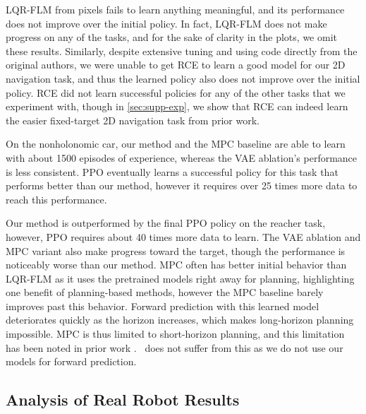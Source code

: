 LQR-FLM from pixels fails to learn anything meaningful, and its performance does not improve over the initial policy. In fact, LQR-FLM does not make progress on any of the tasks, and for the sake of clarity in the plots, we omit these results. Similarly, despite extensive tuning and using code directly from the original authors, we were unable to get RCE to learn a good model for our 2D navigation task, and thus the learned policy also does not improve over the initial policy. RCE did not learn successful policies for any of the other tasks that we experiment with, though in \autoref{sec:supp-exp}, we show that RCE can indeed learn the easier fixed-target 2D navigation task from prior work.

On the nonholonomic car, our method and the MPC baseline are able to learn with about 1500 episodes of experience, whereas the VAE ablation's performance is less consistent. PPO eventually learns a successful policy for this task that performs better than our method, however it requires over 25 times more data to reach this performance.

Our method is outperformed by the final PPO policy on the reacher task, however, PPO requires about 40 times more data to learn. The VAE ablation and MPC variant also make progress toward the target, though the performance is noticeably worse than our method. MPC often has better initial behavior than LQR-FLM as it uses the pretrained models right away for planning, highlighting one benefit of planning-based methods, however the MPC baseline barely improves past this behavior. Forward prediction with this learned model deteriorates quickly as the horizon increases, which makes long-horizon planning impossible. MPC is thus limited to short-horizon planning, and this limitation has been noted in prior work \citep{nn-dyn,mbve}. \metabbr\ does not suffer from this as we do not use our models for forward prediction.


\subsection{Analysis of Real Robot Results}

